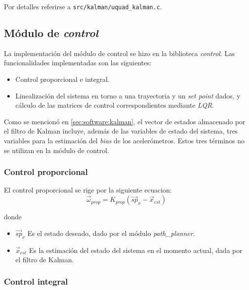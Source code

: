 \documentclass[main]{subfiles}
\begin{document}
Por detalles referirse a \verb+src/kalman/uquad_kalman.c+.

\subsection{M\'odulo de \textit{control}}
\label{sec:software:control}

La implementación del módulo de control se hizo en la biblioteca \textit{control}. Las funcionalidades implementadas son las siguientes:

\begin{itemize}
\item Control proporcional e integral.
\item Linealización del sistema en torno a una trayectoria y un \textit{set point} dados, y c\'alculo de las matrices de control correspondientes mediante \textit{LQR}.
\end{itemize}

Como se mencion\'o en \ref{sec:software:kalman}, el vector de estados almacenado por el filtro de Kalman incluye, adem\'as de las variables de estado del sistema, tres variables para la estimaci\'on del \textit{bias} de los aceler\'ometros. Estos tres t\'erminos no se utilizan en la m\'odulo de control.

\subsubsection{Control proporcional}
\label{sec:software:control-prop}


El control proporcional se rige por la siguiente ecuacion:
\begin{equation}
  \label{eq:software:prop}
  \vec{\omega}_{prop} = K_{prop} (\vec{sp}_x - \vec{x}_{est})
\end{equation}

donde
\begin{itemize}
\item $\vec{sp}_x$ Es el estado deseado, dado por el m\'odulo \textit{path\_planner}.
\item $\vec{x}_{est}$ Es la estimaci\'on del estado del sistema en el momento actual, dada por el filtro de Kalman.
\end{itemize}

\subsubsection{Control integral}
\label{sec:software:control-int}
\end{document}

